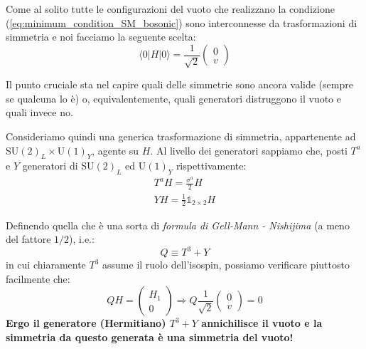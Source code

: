 \documentclass[../main.tex]{subfiles}
\begin{document}
Come al solito tutte le configurazioni del vuoto che realizzano la condizione (\ref{eq:minimum_condition_SM_bosonic}) sono interconnesse da trasformazioni di simmetria e noi facciamo la seguente scelta:
\begin{equation}
    \boxed{\langle0|H|0\rangle = \frac{1}{\sqrt{2}}\begin{pmatrix}0 \\ v \end{pmatrix}}
    \label{eq:vacuum_choice_SM_bosonic}
\end{equation}

Il punto cruciale sta nel capire quali delle simmetrie sono ancora valide (sempre se qualcuna lo è) o, equivalentemente, quali generatori distruggono il vuoto e quali invece no.

Consideriamo quindi una generica trasformazione di simmetria, appartenente ad SU$(2)_L\times$U$(1)_Y$, agente su $H$. Al livello dei generatori sappiamo che, posti $T^a$ e $Y$ generatori di SU$(2)_L$ ed U$(1)_Y$ rispettivamente:
\[
\begin{aligned}
    T^aH = \frac{\sigma^a}{2}H\\
    YH = \frac{1}{2}\mathbb1_{2\times2} H
\end{aligned}
\]

Definendo quella che è una sorta di \textit{formula di Gell-Mann - Nishijima} (a meno del fattore $1/2$), i.e.:
\begin{equation}
    \boxed{Q\equiv T^3 + Y}
    \label{eq:gellmann_nishi_formula}
\end{equation}
in cui chiaramente $T^3$ assume il ruolo dell'isospin, possiamo verificare piuttosto facilmente che:
\[
QH = \begin{pmatrix}H_1 \\ 0 \end{pmatrix} \Rightarrow \boxed{Q\frac{1}{\sqrt{2}}\begin{pmatrix}0 \\ v \end{pmatrix} = 0}
\]
\textbf{Ergo il generatore (Hermitiano) $T^3+Y$ annichilisce il vuoto e la simmetria da questo generata è una simmetria del vuoto!}
\end{document}
